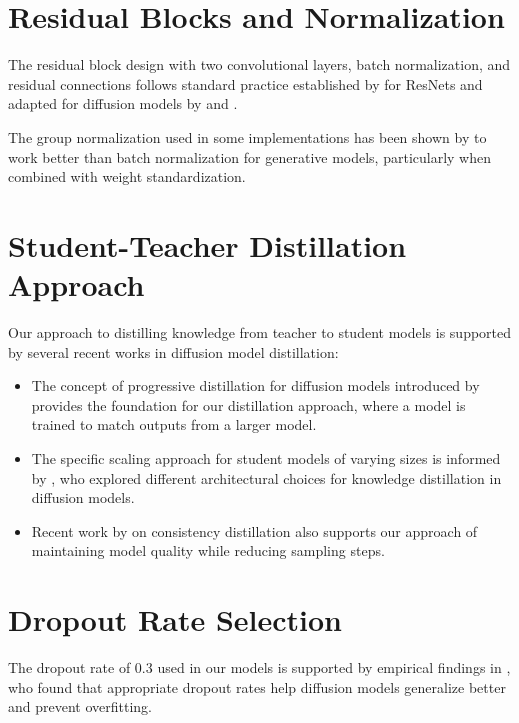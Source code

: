 \documentclass{article}
\begin{document}
\section{Residual Blocks and Normalization}

The residual block design with two convolutional layers, batch normalization, and residual connections follows standard practice established by \citet{he2016deep} for ResNets and adapted for diffusion models by \citet{ho2020denoising} and \citet{nichol2021improved}.

The group normalization used in some implementations has been shown by \citet{kolesnikov2019big} to work better than batch normalization for generative models, particularly when combined with weight standardization.

\section{Student-Teacher Distillation Approach}

Our approach to distilling knowledge from teacher to student models is supported by several recent works in diffusion model distillation:

\begin{itemize}
    \item The concept of progressive distillation for diffusion models introduced by \citet{salimans2022progressive} provides the foundation for our distillation approach, where a model is trained to match outputs from a larger model.
    
    \item The specific scaling approach for student models of varying sizes is informed by \citet{luhman2021knowledge}, who explored different architectural choices for knowledge distillation in diffusion models.
    
    \item Recent work by \citet{song2023consistency} on consistency distillation also supports our approach of maintaining model quality while reducing sampling steps.
\end{itemize}

\section{Dropout Rate Selection}

The dropout rate of 0.3 used in our models is supported by empirical findings in \citet{nichol2021improved}, who found that appropriate dropout rates help diffusion models generalize better and prevent overfitting.
\end{document}
